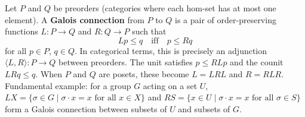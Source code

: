 Let $P$ and $Q$ be preorders (categories where each hom-set has at most one element). A \textbf{Galois connection} from $P$ to $Q$ is a pair of order-preserving functions $L: P \to Q$ and $R: Q \to P$ such that
$$Lp \leq q \quad\text{iff}\quad p \leq Rq$$
for all $p \in P$, $q \in Q$. In categorical terms, this is precisely an adjunction $\langle L, R \rangle: P \to Q$ between preorders. The unit satisfies $p \leq RLp$ and the counit $LRq \leq q$. When $P$ and $Q$ are posets, these become $L = LRL$ and $R = RLR$. Fundamental example: for a group $G$ acting on a set $U$, $LX = \{\sigma \in G \mid \sigma \cdot x = x \text{ for all } x \in X\}$ and $RS = \{x \in U \mid \sigma \cdot x = x \text{ for all } \sigma \in S\}$ form a Galois connection between subsets of $U$ and subsets of $G$.